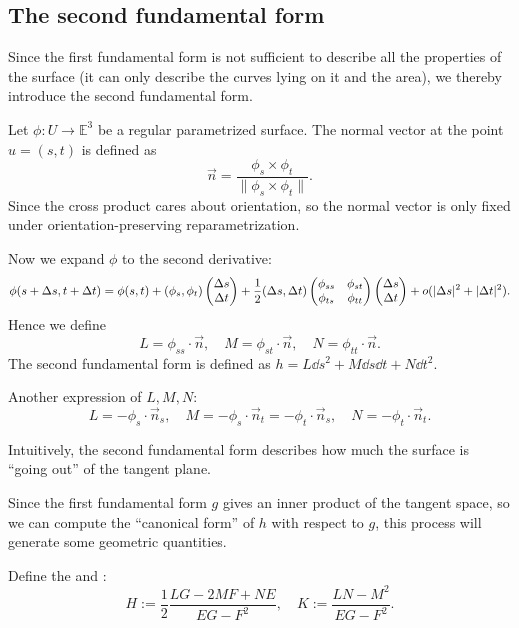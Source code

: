 

\subsection{The second fundamental form}
\label{sub:The second fundamental form}
Since the first fundamental form is not sufficient to describe
all the properties of the surface (it can only describe the curves lying
on it and the area), we thereby introduce the second fundamental form.

\begin{definition}
	Let $\phi:U\to \mathbb{E}^3$ be a regular parametrized surface.
	The normal vector at the point $u=(s,t)$ is defined as
	\[
		\vec{n} = \frac{\phi_s\times \phi_t}{\lVert \phi_s\times \phi_t \rVert }.
	\]
	Since the cross product cares about orientation, so
	the normal vector is only fixed under orientation-preserving
	reparametrization.

	Now we expand $\phi$ to the second derivative:
	\[
	\phi(s+\Delta s, t+\Delta t) =
	\phi(s,t) + (\phi_s, \phi_t)\begin{pmatrix} \Delta s\\\Delta t \end{pmatrix}
	+ \frac{1}{2} (\Delta s, \Delta t)\begin{pmatrix}
		\phi_{ss} &\phi_{st}\\ \phi_{ts} &\phi_{tt}
	\end{pmatrix} \begin{pmatrix} \Delta s\\\Delta t \end{pmatrix}
	+ o(|\Delta s|^2 + |\Delta t|^2).
	\]
	Hence we define
	\[
	L = \phi_{ss}\cdot\vec{n}, \quad M = \phi_{st}\cdot\vec{n},
	\quad N = \phi_{tt}\cdot\vec{n}.
	\]
	The second fundamental form is defined as
	$h = L\dd s^2 + M\dd s\dd t + N\dd t^2$.
\end{definition}
\begin{remark}
    Another expression of $L,M,N$:
	 \[
	L = -\phi_s \cdot \vec{n}_s,\quad M = -\phi_s\cdot \vec{n}_t
	= -\phi_t \cdot \vec{n}_s, \quad N = -\phi_t \cdot \vec{n}_t.
	\]
\end{remark}

Intuitively, the second fundamental form describes
how much the surface is ``going out'' of the tangent plane.

Since the first fundamental form $g$ gives an inner product of
the tangent space, so we can compute the ``canonical form'' of
$h$ with respect to $g$, this process will generate some geometric quantities.

\begin{definition}
	Define the  and :
	\[
	H:= \frac{1}{2}\frac{LG-2MF+NE}{EG-F^2},\quad
	K:= \frac{LN-M^2}{EG-F^2}.
\]
\end{definition}

